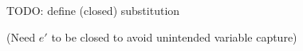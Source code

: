 \documentclass{article}
\begin{document}

TODO: define (closed) substitution

(Need $e'$ to be closed to avoid unintended variable capture)
\end{document}
